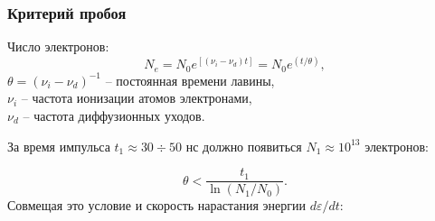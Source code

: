 \documentclass{beamer}
\begin{document}
	\begin{frame}
		\frametitle{Критерий пробоя}
		Число электронов:
		$$ N_e = N_0 e^{\left[(\nu_i - \nu_d) t\right]} = N_0 e^{(t/\theta)},$$
		$\theta = (\nu_i - \nu_d)^{-1}$ -- постоянная времени лавины,\\
		$\nu_i$ -- частота ионизации атомов электронами,\\
		$\nu_d$ -- частота диффузионных уходов.

		За время импульса $t_1 \approx 30 \div 50$ нс должно появиться $N_1 \approx 10^{13}$ электронов:
		
		$$ \theta < \frac{t_1}{\ln( N_1 / N_0)}.$$
		Совмещая это условие и скорость нарастания энергии $d\varepsilon/dt$:
		\begin{center}
		\end{center}
		


%		
%		
%		
%		
%		
%		
%		
%		
%		
%		
%		
	\end{frame}
\end{document}
